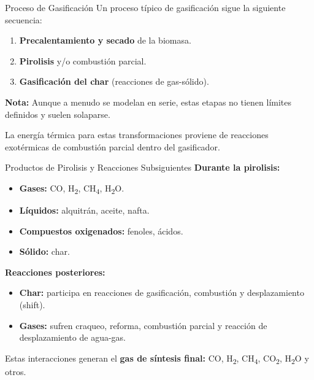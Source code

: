 \documentclass[../../main.tex]{subfiles}
\begin{document}
\begin{frame}{Proceso de Gasificación}
\small
Un proceso típico de gasificación sigue la siguiente secuencia:

\vspace{0.5em}
\begin{enumerate}
  \item \textbf{Precalentamiento y secado} de la biomasa.
  \item \textbf{Pirolisis} y/o combustión parcial.
  \item \textbf{Gasificación del char} (reacciones de gas-sólido).
\end{enumerate}

\vspace{0.5em}
\textbf{Nota:} Aunque a menudo se modelan en serie, estas etapas no tienen límites definidos y suelen solaparse.

\vspace{0.5em}
La energía térmica para estas transformaciones proviene de reacciones exotérmicas de combustión parcial dentro del gasificador.
\end{frame}

\begin{frame}{Productos de Pirolisis y Reacciones Subsiguientes}
\small
\textbf{Durante la pirolisis:}
\begin{itemize}
  \item \textbf{Gases:} CO, H\textsubscript{2}, CH\textsubscript{4}, H\textsubscript{2}O.
  \item \textbf{Líquidos:} alquitrán, aceite, nafta.
  \item \textbf{Compuestos oxigenados:} fenoles, ácidos.
  \item \textbf{Sólido:} char.
\end{itemize}

\textbf{Reacciones posteriores:}
\begin{itemize}
  \item \textbf{Char:} participa en reacciones de gasificación, combustión y desplazamiento (shift).
  \item \textbf{Gases:} sufren craqueo, reforma, combustión parcial y reacción de desplazamiento de agua-gas.
\end{itemize}

\vspace{0.5em}
Estas interacciones generan el \textbf{gas de síntesis final:} CO, H\textsubscript{2}, CH\textsubscript{4}, CO\textsubscript{2}, H\textsubscript{2}O y otros.
\end{frame}
\end{document}
